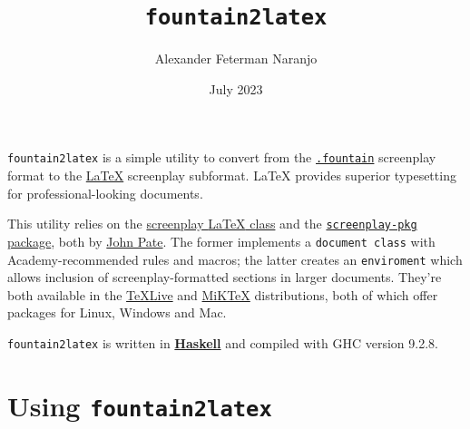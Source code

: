\documentclass[11pt]{article}
\title{\textbf{\texttt{fountain2latex}}}
\author{Alexander Feterman Naranjo}
\date{July 2023}
\newcommand{\link}[2]{\textcolor{Blue}{\href{#1}{#2}}}
\begin{document}
\maketitle

\texttt{fountain2latex} is a simple utility to convert from the
\texttt{\link{https://fountain.io/}{.fountain}} screenplay format to
the \link{https://www.latex-project.org/}{\LaTeX} screenplay subformat.
{\LaTeX} provides superior typesetting for professional-looking
documents.

This utility relies on the
\link{https://www.ctan.org/pkg/screenplay}{screenplay {\LaTeX} class}
and the \link{https://www.ctan.org/pkg/screenplay-pkg}{\texttt{screenplay-pkg} package},
both by \link{http://dvc.org.uk/johnny.html}{John Pate}. The former
implements a \texttt{document class} with Academy-recommended rules and
macros; the latter creates an \texttt{enviroment} which allows inclusion
of screenplay-formatted sections in larger documents. They're both
available in the \link{https://tug.org/texlive/}{TeXLive} and
\link{https://miktex.org/}{MiKTeX} distributions, both of which offer
packages for Linux, Windows and Mac.

\texttt{fountain2latex} is written in \link{https://haskell.org}{\textbf{Haskell}}
and compiled with \textsf{GHC} version 9.2.8.


\section*{Using \texttt{fountain2latex}}
\end{document}
